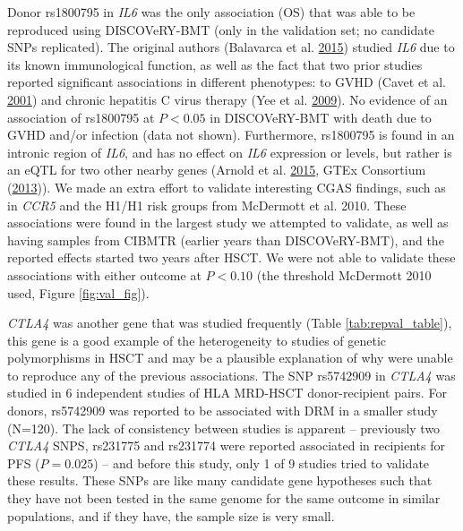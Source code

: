 \documentclass[]{DissertateOSU}
\begin{document}
Donor rs1800795 in \emph{IL6} was the only association (OS) that was
able to be reproduced using DISCOVeRY-BMT (only in the validation set;
no candidate SNPs replicated). The original authors (Balavarca et al.
\protect\hyperlink{ref-balavarca_2015}{2015}) studied \emph{IL6} due to
its known immunological function, as well as the fact that two prior
studies reported significant associations in different phenotypes: to
GVHD (Cavet et al. \protect\hyperlink{ref-cavet_2001}{2001}) and chronic
hepatitis C virus therapy (Yee et al.
\protect\hyperlink{ref-yee_2009}{2009}). No evidence of an association
of rs1800795 at \(P < 0.05\) in DISCOVeRY-BMT with death due to GVHD
and/or infection (data not shown). Furthermore, rs1800795 is found in an
intronic region of \emph{IL6}, and has no effect on \emph{IL6}
expression or levels, but rather is an eQTL for two other nearby genes
(Arnold et al. \protect\hyperlink{ref-snipa}{2015}, GTEx Consortium
(\protect\hyperlink{ref-gtex}{2013})). We made an extra effort to
validate interesting CGAS findings, such as in \emph{CCR5} and the H1/H1
risk groups from McDermott et al. 2010. These associations were found in
the largest study we attempted to validate, as well as having samples
from CIBMTR (earlier years than DISCOVeRY-BMT), and the reported effects
started two years after HSCT. We were not able to validate these
associations with either outcome at \(P < 0.10\) (the threshold
McDermott 2010 used, Figure \ref{fig:val_fig}).

\emph{CTLA4} was another gene that was studied frequently (Table
\ref{tab:repval_table}), this gene is a good example of the
heterogeneity to studies of genetic polymorphisms in HSCT and may be a
plausible explanation of why were unable to reproduce any of the
previous associations. The SNP rs5742909 in \emph{CTLA4} was studied in
6 independent studies of HLA MRD-HSCT donor-recipient pairs. For donors,
rs5742909 was reported to be associated with DRM in a smaller study
(N=120). The lack of consistency between studies is apparent --
previously two \emph{CTLA4} SNPS, rs231775 and rs231774 were reported
associated in recipients for PFS (\(P=0.025\)) -- and before this study,
only 1 of 9 studies tried to validate these results. These SNPs are like
many candidate gene hypotheses such that they have not been tested in
the same genome for the same outcome in similar populations, and if they
have, the sample size is very small.
\end{document}
